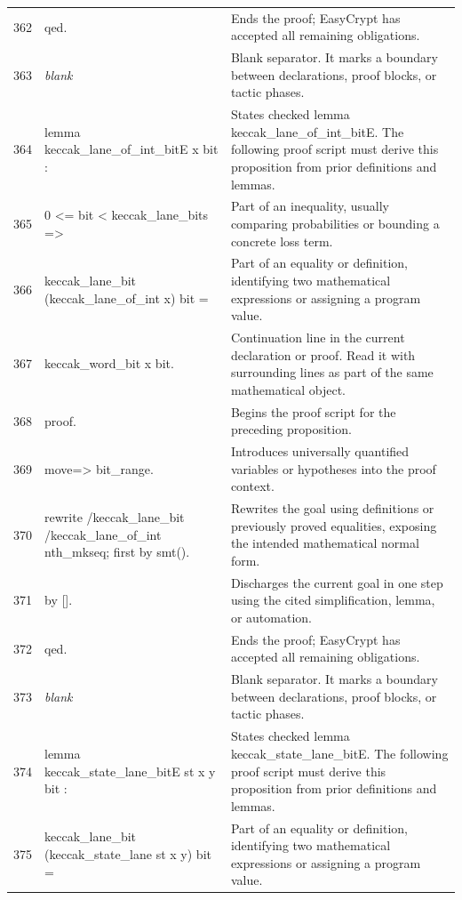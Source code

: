 \documentclass[10pt]{article}
\begin{document}
\begin{longtable}{r L{0.53\textwidth} L{0.37\textwidth}}
362 & {\ttfamily\scriptsize qed.} & Ends the proof; EasyCrypt has accepted all remaining obligations. \\
363 & {\ttfamily\scriptsize \emph{blank}} & Blank separator.  It marks a boundary between declarations, proof blocks, or tactic phases. \\
364 & {\ttfamily\scriptsize lemma keccak\_lane\_of\_int\_bitE x bit :} & States checked lemma keccak\_lane\_of\_int\_bitE.  The following proof script must derive this proposition from prior definitions and lemmas. \\
365 & {\ttfamily\scriptsize   0 <= bit < keccak\_lane\_bits =>} & Part of an inequality, usually comparing probabilities or bounding a concrete loss term. \\
366 & {\ttfamily\scriptsize   keccak\_lane\_bit (keccak\_lane\_of\_int x) bit =} & Part of an equality or definition, identifying two mathematical expressions or assigning a program value. \\
367 & {\ttfamily\scriptsize   keccak\_word\_bit x bit.} & Continuation line in the current declaration or proof.  Read it with surrounding lines as part of the same mathematical object. \\
368 & {\ttfamily\scriptsize proof.} & Begins the proof script for the preceding proposition. \\
369 & {\ttfamily\scriptsize move=> bit\_range.} & Introduces universally quantified variables or hypotheses into the proof context. \\
370 & {\ttfamily\scriptsize rewrite /keccak\_lane\_bit /keccak\_lane\_of\_int nth\_mkseq; first by smt().} & Rewrites the goal using definitions or previously proved equalities, exposing the intended mathematical normal form. \\
371 & {\ttfamily\scriptsize by [].} & Discharges the current goal in one step using the cited simplification, lemma, or automation. \\
372 & {\ttfamily\scriptsize qed.} & Ends the proof; EasyCrypt has accepted all remaining obligations. \\
373 & {\ttfamily\scriptsize \emph{blank}} & Blank separator.  It marks a boundary between declarations, proof blocks, or tactic phases. \\
374 & {\ttfamily\scriptsize lemma keccak\_state\_lane\_bitE st x y bit :} & States checked lemma keccak\_state\_lane\_bitE.  The following proof script must derive this proposition from prior definitions and lemmas. \\
375 & {\ttfamily\scriptsize   keccak\_lane\_bit (keccak\_state\_lane st x y) bit =} & Part of an equality or definition, identifying two mathematical expressions or assigning a program value. \\

\end{longtable}
\end{document}

